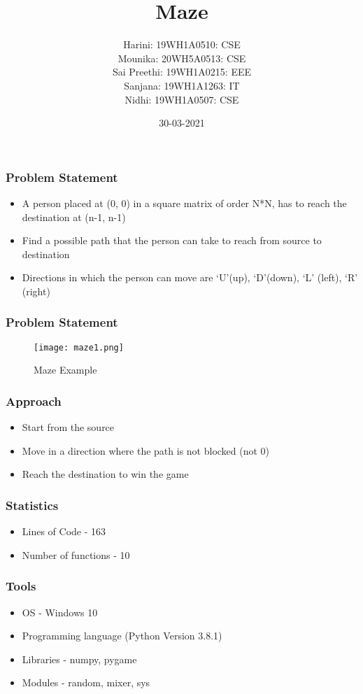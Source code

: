 \documentclass[14pt]{beamer}
\title{Maze}
\date{30-03-2021}
\author[Bvrith]{Harini: 19WH1A0510: CSE \\ Mounika: 20WH5A0513: CSE \\ Sai Preethi: 19WH1A0215: EEE  \\ Sanjana: 19WH1A1263: IT \\  Nidhi: 19WH1A0507: CSE }
\institute{\normalsize{\color{blendedblue}{BVRIT HYDERABAD College of Engineering for Women}}}
\begin{document}
    \begin{frame}
        \titlepage
    \end{frame}
    \begin{frame}
	\frametitle{Problem Statement}
        \begin{itemize}
	    \item A person placed at (0, 0) in a square matrix of order N*N, has to reach the destination at (n-1, n-1)
	    \item Find a possible path that the person can take to reach from source to destination
	    \item Directions in which the person can move are ‘U'(up), ‘D'(down), ‘L’ (left), ‘R’ (right)
	\end{itemize}
    \end{frame}
    \begin{frame}
	    \frametitle{Problem Statement}
	    \begin{figure}[htp]
                        \centering
                         \texttt{[image: maze1.png]}
			 \caption{Maze Example}
                 \end{figure}
    \end{frame}
    \begin{frame}
	\frametitle{Approach}
	\begin{itemize}
		\item Start from the source 
		\item Move in a direction where the path is not blocked (not 0)
		\item Reach the destination to win the game
	\end{itemize}
    \end{frame}
    \begin{frame}
	\frametitle{Statistics}
	\begin{itemize}
		\item Lines of Code - 163
		\item Number of functions - 10
	\end{itemize}
    \end{frame}
    \begin{frame}
	\frametitle{Tools}
	\begin{itemize}
		\item OS - Windows 10
		\item Programming language (Python Version 3.8.1)
		\item Libraries - numpy, pygame
		\item Modules - random, mixer, sys
	\end{itemize}
    \end{frame}
\end{document}
